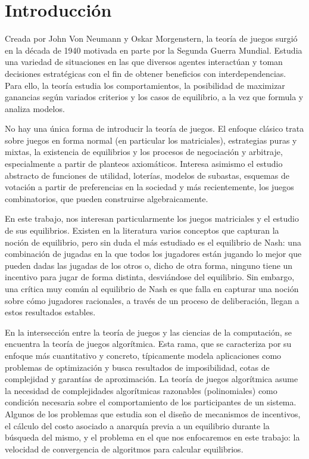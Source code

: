 \chapter{Introducción} \label{cap:intro}

Creada por John Von Neumann y Oskar Morgenstern, la teoría de juegos surgió en la década de 1940 motivada en parte por la Segunda Guerra Mundial. Estudia una variedad de situaciones en las que diversos agentes interactúan y toman decisiones estratégicas con el fin de obtener beneficios con interdependencias. Para ello, la teoría estudia los comportamientos, la posibilidad de maximizar ganancias según variados criterios y los casos de equilibrio, a la vez que formula y analiza modelos.

No hay una única forma de introducir la teoría de juegos. El enfoque clásico trata sobre juegos en forma normal (en particular los matriciales), estrategias puras y mixtas, la existencia de equilibrios y los procesos de negociación y arbitraje, especialmente a partir de planteos axiomáticos. Interesa asimismo el estudio abstracto de funciones de utilidad, loterías, modelos de subastas, esquemas de votación a partir de preferencias en la sociedad y más recientemente, los juegos combinatorios, que pueden construirse algebraicamente.

En este trabajo, nos interesan particularmente los juegos matriciales y el estudio de sus equilibrios. Existen en la literatura varios conceptos que capturan la noción de equilibrio, pero sin duda el más estudiado es el equilibrio de Nash: una combinación de jugadas en la que todos los jugadores están jugando lo mejor que pueden dadas las jugadas de los otros o, dicho de otra forma, ninguno tiene un incentivo para jugar de forma distinta, desviándose del equilibrio. Sin embargo, una crítica muy común al equilibrio de Nash es que falla en capturar una noción sobre cómo jugadores racionales, a través de un proceso de deliberación, llegan a estos resultados estables.

En la intersección entre la teoría de juegos y las ciencias de la computación, se encuentra la teoría de juegos algorítmica. Esta rama, que se caracteriza por su enfoque más cuantitativo y concreto, típicamente modela aplicaciones como problemas de optimización y busca resultados de imposibilidad, cotas de complejidad y garantías de aproximación. La teoría de juegos algorítmica asume la necesidad de complejidades algorítmicas razonables (polinomiales) como condición necesaria sobre el comportamiento de los participantes de un sistema. Algunos de los problemas que estudia son el diseño de mecanismos de incentivos, el cálculo del costo asociado a anarquía previa a un equilibrio durante la búsqueda del mismo, y el problema en el que nos enfocaremos en este trabajo: la velocidad de convergencia de algoritmos para calcular equilibrios.

